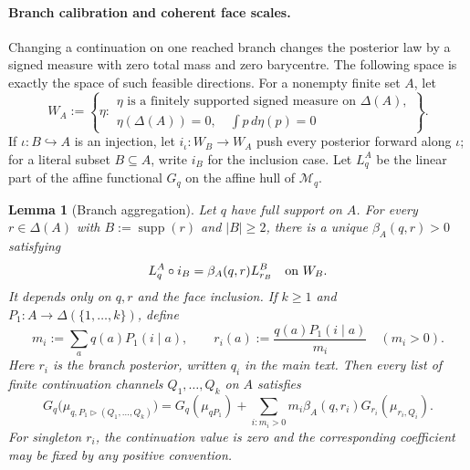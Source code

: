 \documentclass[11pt,a4paper]{article}
\newtheorem{lemma}[theorem]{Lemma}
\theoremstyle{definition}
\newcommand{\1}{\mathbf 1}
\begin{document}
\paragraph{Branch calibration and coherent face scales.}

Changing a continuation on one reached branch changes the posterior law by a
signed measure with zero total mass and zero barycentre.  The following space
is exactly the space of such feasible directions.
For a nonempty finite set $A$, let
\[
 W_A:=\left\{\eta:
 \begin{array}{l}
 \eta\text{ is a finitely supported signed measure on }\Delta(A),\\[-2pt]
 \eta(\Delta(A))=0,\quad \displaystyle\int p\,d\eta(p)=0
 \end{array}\right\}.
\]
If $\iota:B\hookrightarrow A$ is an injection, let
$i_\iota:W_B\to W_A$ push every posterior forward along $\iota$; for a
literal subset $B\subseteq A$, write $i_B$ for the inclusion case.  Let
$L_q^A$ be the linear part of the affine functional $G_q$ on the affine hull
of $\mathcal M_q$.

\begin{lemma}[Branch aggregation]
\label{pt:lem:branchagg}
Let $q$ have full support on $A$.  For every $r\in\Delta(A)$ with
$B:=\operatorname{supp}(r)$ and $|B|\ge2$, there is a unique
$\beta_A(q,r)>0$ satisfying
\begin{equation}
 L_q^A\circ i_B=\beta_A(q,r)L_{r_B}^B
 \quad\hbox{on }W_B.
\label{pt:eq:branch-linear}
\end{equation}
It depends only on $q,r$ and the face inclusion.  If $k\ge1$ and
$P_1:A\to\Delta(\{1,\ldots,k\})$, define
\begin{equation}
 m_i:=\sum_aq(a)P_1(i\mid a),\qquad
 r_i(a):=\frac{q(a)P_1(i\mid a)}{m_i}\quad(m_i>0).
\label{pt:eq:branch-notation}
\end{equation}
Here $r_i$ is the branch posterior, written $q_i$ in the main text.
Then every list of finite continuation channels $Q_1,\ldots,Q_k$ on $A$
satisfies
\begin{equation}
 G_q\bigl(\mu_{q,P_1\triangleright(Q_1,\ldots,Q_k)}\bigr)
 =G_q(\mu_{qP_1})+
 \sum_{i:m_i>0}m_i\beta_A(q,r_i)
 G_{r_i}(\mu_{r_i,Q_i}).
\tag{BA}\label{pt:eq:branchaggregation}
\end{equation}
For singleton $r_i$, the continuation value is zero and the corresponding
coefficient may be fixed by any positive convention.
\end{lemma}
\end{document}
